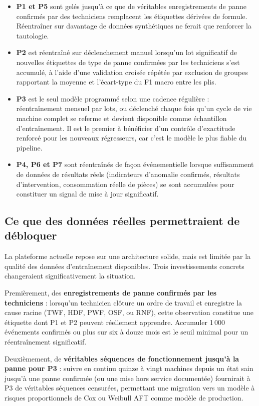 \begin{itemize}
\item \textbf{P1 et P5} sont gelés jusqu'à ce que de véritables enregistrements de panne confirmés par des techniciens remplacent les étiquettes dérivées de formule. Réentraîner sur davantage de données synthétiques ne ferait que renforcer la tautologie.
\item \textbf{P2} est réentraîné sur déclenchement manuel lorsqu'un lot significatif de nouvelles étiquettes de type de panne confirmées par les techniciens s'est accumulé, à l'aide d'une validation croisée répétée par exclusion de groupes rapportant la moyenne et l'écart-type du F1 macro entre les plis.
\item \textbf{P3} est le seul modèle programmé selon une cadence régulière : réentraînement mensuel par lots, ou déclenché chaque fois qu'un cycle de vie machine complet se referme et devient disponible comme échantillon d'entraînement. Il est le premier à bénéficier d'un contrôle d'exactitude renforcé pour les nouveaux régresseurs, car c'est le modèle le plus fiable du pipeline.
\item \textbf{P4, P6 et P7} sont réentraînés de façon événementielle lorsque suffisamment de données de résultats réels (indicateurs d'anomalie confirmés, résultats d'intervention, consommation réelle de pièces) se sont accumulées pour constituer un signal de mise à jour significatif.
\end{itemize}

\subsection{Ce que des données réelles permettraient de débloquer}

La plateforme actuelle repose sur une architecture solide, mais est limitée par la qualité des données d'entraînement disponibles. Trois investissements concrets changeraient significativement la situation.

Premièrement, des \textbf{enregistrements de panne confirmés par les techniciens} : lorsqu'un technicien clôture un ordre de travail et enregistre la cause racine (TWF, HDF, PWF, OSF, ou RNF), cette observation constitue une étiquette dont P1 et P2 peuvent réellement apprendre. Accumuler 1\,000 événements confirmés ou plus sur six à douze mois est le seuil minimal pour un réentraînement significatif.

Deuxièmement, de \textbf{véritables séquences de fonctionnement jusqu'à la panne pour P3} : suivre en continu quinze à vingt machines depuis un état sain jusqu'à une panne confirmée (ou une mise hors service documentée) fournirait à P3 de véritables séquences censurées, permettant une migration vers un modèle à risques proportionnels de Cox ou Weibull AFT comme modèle de production.

